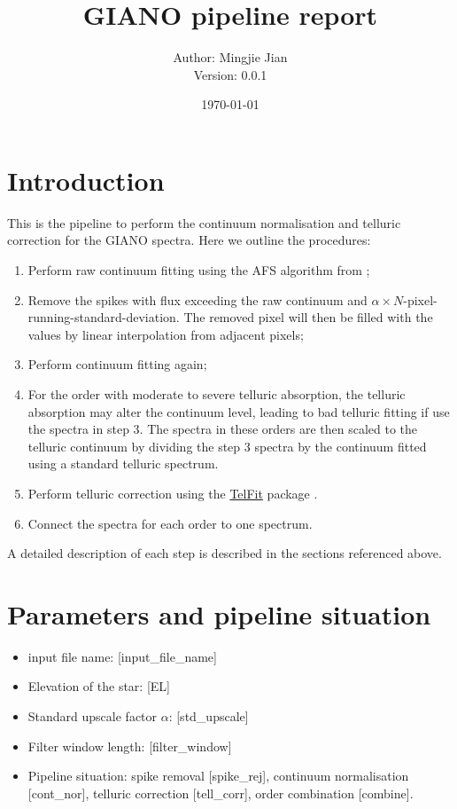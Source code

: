 \documentclass{article}
\title{GIANO pipeline report}
\author{Author: Mingjie Jian \\Version: 0.0.1}
\date{\today}
\begin{document}
\maketitle

\tableofcontents

\section{Introduction}

This is the pipeline to perform the continuum normalisation and telluric correction for the GIANO spectra. 
Here we outline the procedures:
\begin{enumerate}
    \item Perform raw continuum fitting using the AFS algorithm from \citet[][the same algorithm is also used below]{Xu2019};
    \item Remove the spikes with flux exceeding the raw continuum and $\alpha \times N$-pixel-running-standard-deviation. The removed pixel will then be filled with the values by linear interpolation from adjacent pixels; 
    \item Perform continuum fitting again;
    \item For the order with moderate to severe telluric absorption, the telluric absorption may alter the continuum level, leading to bad telluric fitting if use the spectra in step 3. The spectra in these orders are then scaled to the telluric continuum by dividing the step 3 spectra by the continuum fitted using a standard telluric spectrum.
    \item Perform telluric correction using the \hyperlink{https://github.com/kgullikson88/Telluric-Fitter}{TelFit} package \citep{Gullikson2014}.
    \item Connect the spectra for each order to one spectrum.
\end{enumerate}

A detailed description of each step is described in the sections referenced above.

\section{Parameters and pipeline situation}

\begin{itemize}
    \item input file name: [input_file_name]
    \item Elevation of the star: [EL]
    \item Standard upscale factor $\alpha$: [std_upscale]
    \item Filter window length: [filter_window]
    \item Pipeline situation: spike removal [spike_rej], continuum normalisation [cont_nor], telluric correction [tell_corr], order combination [combine]. 
\end{itemize}
\end{document}
